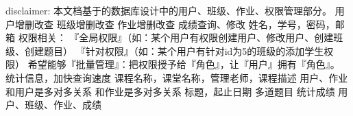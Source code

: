 \markdownRendererInterblockSeparator
{}disclaimer: 本文档基于的数据库设计中的用户、班级、作业、权限管理部分。\markdownRendererInterblockSeparator
{}\markdownRendererInterblockSeparator
{}\markdownRendererUlBeginTight
\markdownRendererUlItem 用户增删改查\markdownRendererUlItemEnd 
\markdownRendererUlItem 班级增删改查\markdownRendererUlItemEnd 
\markdownRendererUlItem 作业增删改查\markdownRendererUlItemEnd 
\markdownRendererUlItem 成绩查询、修改\markdownRendererUlItemEnd 
\markdownRendererUlEndTight \markdownRendererInterblockSeparator
{}\markdownRendererInterblockSeparator
{}\markdownRendererUlBeginTight
\markdownRendererUlItem 姓名，学号，密码，邮箱\markdownRendererUlItemEnd 
\markdownRendererUlItem 权限相关：\markdownRendererInterblockSeparator
{}\markdownRendererUlBeginTight
\markdownRendererUlItem 『全局权限』（如：某个用户有权限创建用户、修改用户、创建班级、创建题目）\markdownRendererUlItemEnd 
\markdownRendererUlItem 『针对权限』（如：某个用户有针对id为5的班级的添加学生权限）\markdownRendererUlItemEnd 
\markdownRendererUlItem 希望能够『批量管理』：把权限授予给『角色』，让『用户』拥有『角色』。\markdownRendererUlItemEnd 
\markdownRendererUlEndTight \markdownRendererUlItemEnd 
\markdownRendererUlItem 统计信息，加快查询速度\markdownRendererUlItemEnd 
\markdownRendererUlEndTight \markdownRendererInterblockSeparator
{}\markdownRendererInterblockSeparator
{}\markdownRendererUlBeginTight
\markdownRendererUlItem 课程名称，课堂名称，管理老师，课程描述\markdownRendererUlItemEnd 
\markdownRendererUlItem 用户、作业\markdownRendererInterblockSeparator
{}\markdownRendererUlBeginTight
\markdownRendererUlItem 和用户是多对多关系\markdownRendererUlItemEnd 
\markdownRendererUlItem 和作业是多对多关系\markdownRendererUlItemEnd 
\markdownRendererUlEndTight \markdownRendererUlItemEnd 
\markdownRendererUlEndTight \markdownRendererInterblockSeparator
{}\markdownRendererInterblockSeparator
{}\markdownRendererUlBeginTight
\markdownRendererUlItem 标题，起止日期\markdownRendererUlItemEnd 
\markdownRendererUlItem 多道题目\markdownRendererUlItemEnd 
\markdownRendererUlItem 统计成绩\markdownRendererUlItemEnd 
\markdownRendererUlEndTight \markdownRendererInterblockSeparator
{}\markdownRendererInterblockSeparator
{}\markdownRendererUlBeginTight
\markdownRendererUlItem 用户、班级、作业、成绩\markdownRendererUlItemEnd 
